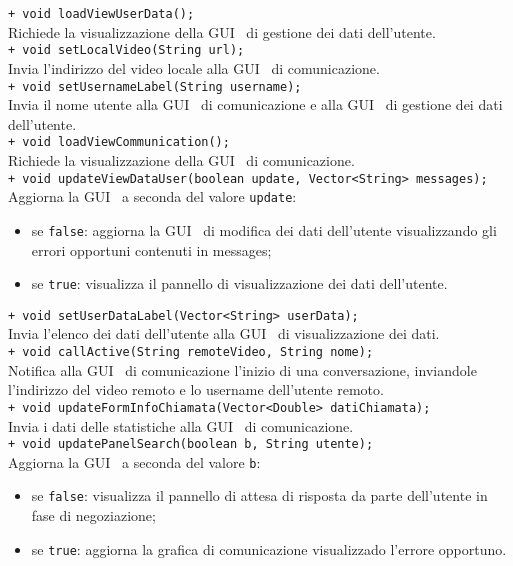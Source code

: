 {\begin{sloppypar}
{\begin{itemize}
\begin{itemize}
			\texttt{+ void loadViewUserData();}\\
			Richiede la visualizzazione della GUI\g~ di gestione dei dati dell’utente.\\

			\texttt{+ void setLocalVideo(String url);}\\
			Invia l’indirizzo del video locale alla GUI\g~ di comunicazione.\\

			\texttt{+ void setUsernameLabel(String username);}\\
			Invia il nome utente alla GUI\g~ di comunicazione e alla GUI\g~ di gestione dei dati dell’utente.\\

			\texttt{+ void loadViewCommunication();}\\
			Richiede la visualizzazione della GUI\g~ di comunicazione.\\

			\texttt{+ void updateViewDataUser(boolean update, Vector<String> messages);}\\
			Aggiorna la GUI\g~ a seconda del valore \texttt{update}:
			\begin{itemize}
				\item se \texttt{false}: aggiorna la GUI\g~ di modifica dei dati dell’utente visualizzando gli errori opportuni contenuti in messages;
				\item se \texttt{true}: visualizza il pannello di visualizzazione dei dati dell’utente.\\
			\end{itemize}

			\texttt{+ void setUserDataLabel(Vector<String> userData);}\\
			Invia l’elenco dei dati dell’utente alla GUI\g~ di visualizzazione dei dati.\\

			\texttt{+ void callActive(String remoteVideo, String nome);}\\
			Notifica alla GUI\g~ di comunicazione l’inizio di una conversazione, inviandole l’indirizzo del video remoto e lo username dell’utente remoto.\\

			\texttt{+ void updateFormInfoChiamata(Vector<Double> datiChiamata);}\\
			Invia i dati delle statistiche alla GUI\g~ di comunicazione.\\

			\texttt{+ void updatePanelSearch(boolean b, String utente);}\\
			Aggiorna la GUI\g~ a seconda del valore \texttt{b}:
			\begin{itemize}
				\item se \texttt{false}: visualizza il pannello di attesa di risposta da parte dell’utente in fase di negoziazione;
				\item se \texttt{true}: aggiorna la grafica di comunicazione visualizzado l’errore opportuno.\\
			\end{itemize}


\end{itemize}
\end{itemize}}
\end{sloppypar}}
